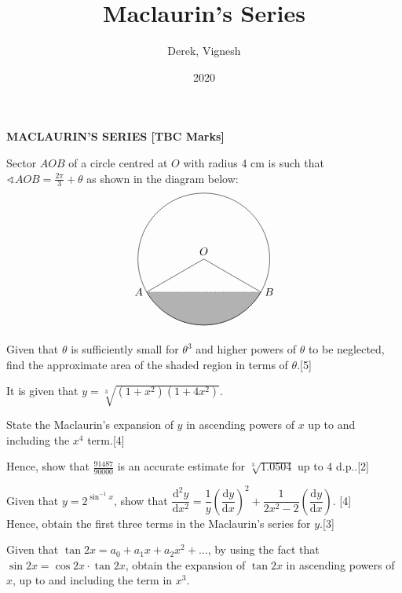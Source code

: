 \documentclass[12pt, a4 paper]{article}
\title{Maclaurin's Series}
\author{Derek, Vignesh}
\date{2020}
\begin{document}
\maketitle

\textbf{MACLAURIN'S SERIES [TBC Marks]}
\begin{outline}[enumerate]
\1 Sector $AOB$ of a circle centred at $O$ with radius 4 cm is such that $\sphericalangle AOB = \frac{2\pi}{3}+\theta$ as shown in the diagram below: %
\[
\begin{tikzpicture}
  \draw (0,0) node[above]{$O$} circle (60pt);
  \draw (-51.96152pt,-30pt) node[left]{$A$} -- (0,0);
  \draw (51.96152pt,-30pt) node[right]{$B$} -- (0,0);
  \filldraw[color=white!70!black,draw=black] (-51.96152pt,-30pt) arc (210:330:60pt);
  \draw[dotted](-51.96152pt,-30pt) -- (51.96152pt,-30pt);
\end{tikzpicture}
\]
Given that $\theta$ is sufficiently small for $\theta^3$ and higher powers of $\theta$ to be neglected, find the approximate area of the shaded region in terms of $\theta$.\hfill[5]

\1 It is given that $y=\sqrt[3]{(1+x^2)(1+4x^2)}$. %

  \2 State the Maclaurin's expansion of $y$ in ascending powers of $x$ up to and including the $x^4$ term.\hfill[4]

  \2 Hence, show that $\frac{91487}{90000}$ is an accurate estimate for $\sqrt[3]{1.0504}$  up to 4 d.p..\hfill[2]

\1 Given that $y=2^{\sin^{-1}{x}}$, show that $\dfrac{\mathrm{d}^2y}{\mathrm{d}x^2}=\dfrac{1}{y}\left(\dfrac{\mathrm{d}y}{\mathrm{d}x}\right)^2+\dfrac{1}{2x^2-2}\left(\dfrac{\mathrm{d}y}{\mathrm{d}x}\right)$. \hfill[4] \\
Hence, obtain the first three terms in the Maclaurin's series for $y$.\hfill[3] %

\1 Given that $\tan{2x}=a_{0}+a_{1}x+a_{2}x^2+...$, by using the fact that $\sin{2x}=\cos{2x}\cdot \tan{2x}$, obtain the expansion of $\tan{2x}$ in ascending powers of $x$, up to and including the term in $x^3$.


\end{outline}
\end{document}
